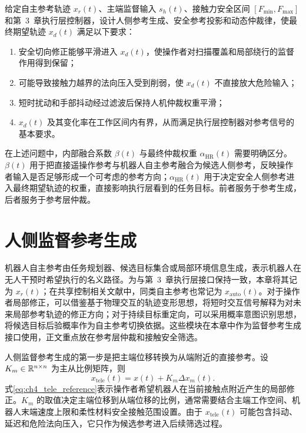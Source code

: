 \begin{problem}[柔性接触人机动态仲裁问题]
\label{prob:ch4_hr_arbitration}
给定自主参考轨迹 $x_r(t)$、主端监督输入 $s_h(t)$、接触力安全区间 $[F_{\min},F_{\max}]$ 和第~3~章执行层控制器，设计人侧参考生成、安全参考投影和动态仲裁律，使最终期望轨迹 $x_d(t)$ 满足以下要求：
\begin{enumerate}[label=(\arabic*)]
  \item 安全切向修正能够平滑进入 $x_d(t)$，使操作者对扫描覆盖和局部绕行的监督作用得到保留；
  \item 可能导致接触力越界的法向压入受到削弱，使 $x_d(t)$ 不直接放大危险输入；
  \item 短时扰动和手部抖动经过滤波后保持人机仲裁权重平滑；
  \item $x_d(t)$ 及其变化率在工作区间内有界，从而满足执行层控制器对参考信号的基本要求。
\end{enumerate}
\end{problem}

在上述问题中，内部融合系数 $\beta(t)$ 与最终仲裁权重 $\alpha_{\mathrm{HR}}(t)$ 需要明确区分。$\beta(t)$ 用于把直接遥操作参考与机器人自主参考融合为候选人侧参考，反映操作者输入是否足够形成一个可考虑的参考方向；$\alpha_{\mathrm{HR}}(t)$ 用于决定安全人侧参考进入最终期望轨迹的权重，直接影响执行层看到的任务目标。前者服务于参考生成，后者服务于参考层仲裁。

\section{人侧监督参考生成}
\label{sec:ch4_supervised_reference}

机器人自主参考由任务规划器、候选目标集合或局部环境信息生成，表示机器人在无人干预时希望执行的名义路径。为与第~3~章执行层接口保持一致，本章将其记为 $x_r(t)$；在共享控制相关文献中，同类自主参考也常记为 $x_{\mathrm{auto}}(t)$。对于操作者局部修正，可以借鉴基于物理交互的轨迹变形思想，将短时交互信号解释为对未来局部参考轨迹的修正方向；对于持续目标重定向，可以采用概率意图识别思想，将候选目标后验概率作为自主参考切换依据\cite{jain2020probabilistic}。这些模块在本章中作为监督参考生成接口使用，正文重点放在参考层仲裁和接触安全筛选。

人侧监督参考生成的第一步是把主端位移转换为从端附近的直接参考。设 $K_m\in\mathbb{R}^{n\times n}$ 为主从比例矩阵，则
\begin{equation}
  x_{\mathrm{tele}}(t)=x(t)+K_m\Delta x_m(t).
  \label{eq:ch4_tele_reference}
\end{equation}
式\eqref{eq:ch4_tele_reference}表示操作者希望机器人在当前接触点附近产生的局部修正。$K_m$ 的取值决定主端位移到从端位移的比例，通常需要结合主端工作空间、机器人末端速度上限和柔性材料安全接触范围设置。由于 $x_{\mathrm{tele}}(t)$ 可能包含抖动、延迟和危险法向压入，它只作为候选参考进入后续筛选过程。

